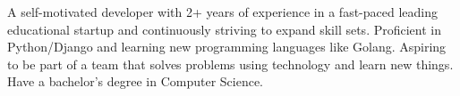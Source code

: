 

\begin{cvparagraph}

\vspace{1mm}
A self-motivated developer with 2+ years of experience in a fast-paced leading educational startup
and continuously striving to expand skill sets. Proficient in Python/Django and learning new programming languages like Golang.
Aspiring to be part of a team that solves problems using technology and learn new things. Have a bachelor’s degree in Computer Science.
\end{cvparagraph}
